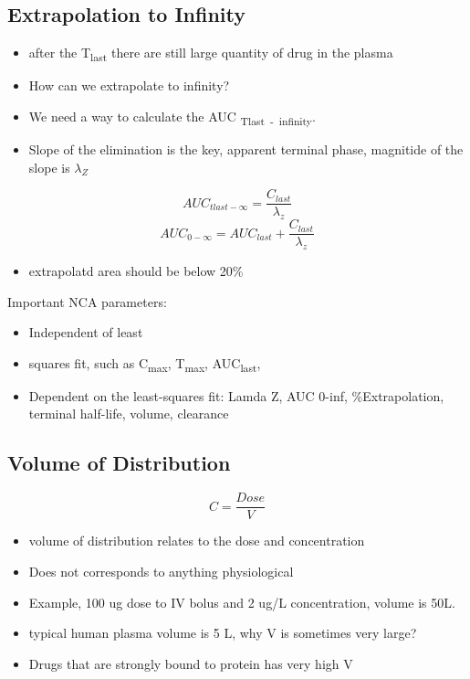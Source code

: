 \documentclass[
  letterpaper,
  DIV=11,
  numbers=noendperiod]{scrreprt}
\providecommand{\tightlist}{%
  \setlength{\itemsep}{0pt}\setlength{\parskip}{0pt}}\usepackage{longtable,booktabs,array}
\begin{document}
\hypertarget{extrapolation-to-infinity}{%
\subsection{Extrapolation to Infinity}\label{extrapolation-to-infinity}}

\begin{itemize}
\item
  after the T\textsubscript{last} there are still large quantity of drug
  in the plasma
\item
  How can we extrapolate to infinity?
\item
  We need a way to calculate the AUC \textsubscript{Tlast~-~infinity}.
\item
  Slope of the elimination is the key, apparent terminal phase,
  magnitide of the slope is \(\lambda_Z\)
\end{itemize}

\[
AUC _{tlast - \infty} = \frac{C_{last}}{\lambda_z}
\] \[
AUC _{0 - \infty} = AUC_{last} + \frac{C_{last}}{\lambda_z}
\]

\begin{itemize}
\tightlist
\item
  extrapolatd area should be below 20\%
\end{itemize}

Important NCA parameters:

\begin{itemize}
\item
  Independent of least
\item
  squares fit, such as C\textsubscript{max}, T\textsubscript{max},
  AUC\textsubscript{last},
\item
  Dependent on the least-squares fit: Lamda Z, AUC 0-inf,
  \%Extrapolation, terminal half-life, volume, clearance
\end{itemize}

\hypertarget{volume-of-distribution}{%
\subsection{Volume of Distribution}\label{volume-of-distribution}}

\[
C = \frac{Dose}{V}
\]

\begin{itemize}
\item
  volume of distribution relates to the dose and concentration
\item
  Does not corresponds to anything physiological
\item
  Example, 100 ug dose to IV bolus and 2 ug/L concentration, volume is
  50L.
\item
  typical human plasma volume is 5 L, why V is sometimes very large?
\item
  Drugs that are strongly bound to protein has very high V
\end{itemize}
\end{document}
